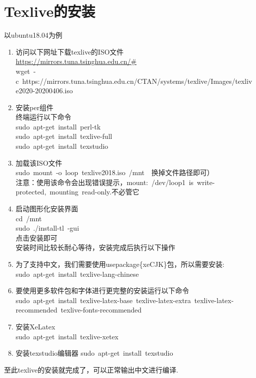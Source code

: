 \documentclass[10pt, oneside, a4paper]{article}      %
\begin{document}

\section{\textrm{Texlive}的安装}
以\textrm{ubuntu18.04}为例
\begin{enumerate}
	\item 访问以下网址下载texlive的ISO文件\\
		\url{https://mirrors.tuna.tsinghua.edu.cn/#}\\
		\textrm{wget~-c~https://mirrors.tuna.tsinghua.edu.cn/CTAN/systems/texlive/Images/texlive2020-20200406.iso}
	\item 安装\textrm{per}组件\\
终端运行以下命令\\
\textrm{sudo~apt-get~install~perl-tk}\\
\textrm{sudo~apt-get~install~texlive-full}\\
\textrm{sudo~apt-get~install~texstudio}\\
\item 加载该ISO文件\\
	\textrm{sudo~mount~-o~loop~texlive2018.iso~/mnt}~~换掉文件路径即可）\\
	注意：使用该命令会出现错误提示，\textrm{mount:~/dev/loop1~is~write-protected,~mounting~read-only.}不必管它
\item 启动图形化安装界面\\
	\textrm{cd~/mnt}\\
	\textrm{sudo~./install-tl~-gui}\\
点击安装即可\\
安装时间比较长耐心等待，安装完成后执行以下操作
\item 为了支持中文，我们需要使用\textrm{usepackage\{xeCJK\}}包，所以需要安装:\\
	\textrm{sudo~apt-get~install~texlive-lang-chinese}
\item 要使用更多软件包和字体进行更完整的安装运行以下命令\\
	\textrm{sudo~apt-get~install~texlive-latex-base~texlive-latex-extra~texlive-latex-recommended~texlive-fonts-recommended}
\item 安装\textrm{XeLatex}\\
	\textrm{sudo~apt-get~install~texlive-xetex}
\item 安装\textrm{texstudio}编辑器
	\textrm{sudo~apt-get~install~texstudio}
\end{enumerate}
至此\textrm{texlive}的安装就完成了，可以正常输出中文进行编译.
\end{document}
